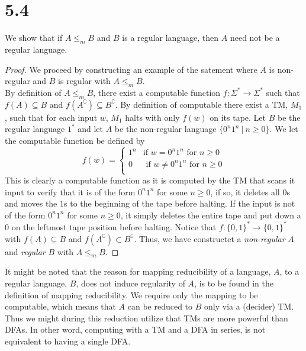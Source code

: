 \documentclass[a4paper,11pt]{article}
\numberwithin{equation}{section}
\begin{document}
\section*{5.4}
We show that if $ A\leq_m B $ and $ B $ is a regular language, then $ A $ need not be a regular language.
\begin{proof} We proceed by constructing an example of the satement where $ A $ is non-regular and $ B $ is regular with $ A\leq_m B $.\\
	By definition of $ A\leq_m B $, there exist a computable function $ f:\Sigma^*\to\Sigma^* $ such that $ f(A)\subseteq B $ and $ f(A^\complement)\subseteq B^\complement $. By definition of computable there exist a TM, $ M_1 $, such that for each input $ w $, $ M_1 $ halts with only $ f(w) $ on its tape. Let $ B $ be the regular language $ 1^* $ and let $ A $ be the non-regular language $ \{0^n1^n\ \vert\ n\geq0\} $. We let the computable function be defined by\begin{equation}
	f(w)=\begin{cases}
	1^n&\text{if }w=0^n1^n\text{ for }n\geq0\\
	0&\text{ if }w\neq0^n1^n\text{ for }n\geq0\\
	\end{cases}
	\end{equation}
	This is clearly a computable function as it is computed by the TM that scans it input to verify that it is of the form $ 0^n1^n $ for some $ n\geq 0 $, if so, it deletes all $ 0 $s and moves the $ 1 $s to the beginning of the tape before halting. If the input is not of the form $ 0^n1^n $ for some $ n\geq 0 $, it simply deletes the entire tape and put down a $ 0 $ on the leftmost tape position before halting.
	Notice that $ f:\{0,1\}^*\to\{0,1\}^* $ with $ f(A)\subseteq B $ and $ f(A^\complement)\subset B^\complement $. Thus, we have constructet a \emph{non-regular} $ A $ and \emph{regular} $ B $ with $ A\leq_m B $.
\end{proof}
	It might be noted that the reason for mapping reducibility of a language, $ A $, to a regular language, $ B $, does not induce regularity of $ A $, is to be found in the definition of mapping reducibility. We require only the mapping to be computable, which means that $ A $ can be reduced to $ B $ only via a (decider) TM. Thus we might during this reduction utilize that TMs are more powerful than DFAs. In other word, computing with a TM and a DFA in series, is not equivalent to having a single DFA.
\end{document}
